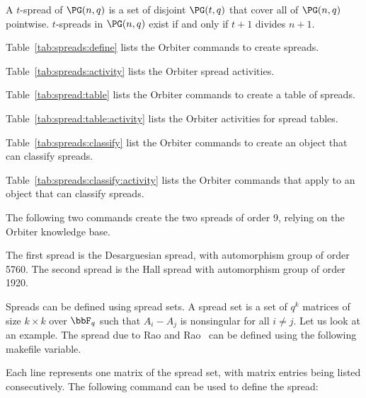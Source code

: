 


A $t$-spread of $\PG(n,q)$ is a set of disjoint 
$\PG(t,q)$ that cover all of $\PG(n,q)$ pointwise. 
$t$-spreads in $\PG(n,q)$ exist if and only if $t+1$ divides $n+1.$


Table~\ref{tab:spreads:define} lists the Orbiter commands to create spreads.


Table~\ref{tab:spreads:activity} lists the Orbiter spread activities.



Table~\ref{tab:spread:table} lists the Orbiter commands to create a table of spreads.

Table~\ref{tab:spread:table:activity} lists the Orbiter activities for spread tables.




Table~\ref{tab:spreads:classify} list the Orbiter commands to create an object that can classify spreads.


Table~\ref{tab:spreads:classify:activity} 
lists the Orbiter commands that apply to an object that can classify spreads.




\bigskip

The following two commands create the two spreads of order 9, 
relying on the Orbiter knowledge base.




The first spread is the Desarguesian spread, 
with automorphism group of order 5760.
The second spread is the Hall spread 
with automorphism group of order 1920.

\bigskip

Spreads can be defined using spread sets. 
A spread set is a set of $q^k$ matrices 
of size $k \times k$ over $\bbF_q$ such that $A_i-A_j$ 
is nonsingular for all $i \neq j.$ 
Let us look at an example. 
The spread due to Rao and Rao~\cite{RaoRao1976} 
can be defined using the following makefile variable. 


Each line represents one matrix of the spread set, 
with matrix entries being listed consecutively.
The following command can be used to define the spread:

